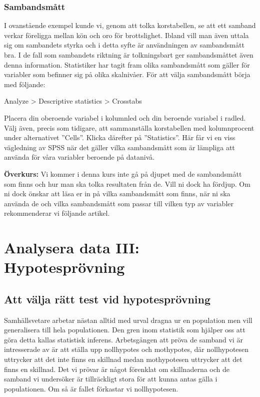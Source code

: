 \documentclass[
]{book}
\begin{document}
\hypertarget{sambandsmuxe5tt}{%
\section{Sambandsmått}\label{sambandsmuxe5tt}}

I ovanstående exempel kunde vi, genom att tolka korstabellen, se att ett samband verkar föreligga
mellan kön och oro för brottslighet. Ibland vill man även uttala sig om sambandets styrka och i detta
syfte är användningen av sambandsmått bra. I de fall som sambandets riktning är tolkningsbart ger
sambandsmåttet även denna information. Statistiker har tagit fram olika sambandsmått som gäller för
variabler som befinner sig på olika skalnivåer. För att välja sambandsmått börja med följande:

Analyze \textgreater{} Descriptive statistics \textgreater{} Crosstabs

Placera din oberoende variabel i kolumnled och din beroende variabel i radled. Välj även, precis som
tidigare, att sammanställa korstabellen med kolumnprocent under alternativet ''Cells''. Klicka därefter
på ''Statistics''. Här får vi en viss vägledning av SPSS när det gäller vilka sambandsmått som är lämpliga att använda för våra variabler beroende på datanivå.

\textbf{Överkurs:}
Vi kommer i denna kurs inte gå på djupet med de sambandsmått som finns och hur man ska tolka resultaten från de. Vill ni dock ha fördjup. Om ni dock önskar att läsa er in på vilka sambandsmått som finns, när ni ska använda de och vilka sambandsmått som passar till vilken typ av variabler rekommenderar vi följande artikel.

\hypertarget{part-analysera-data-iii-hypotespruxf6vning}{%
\part*{Analysera data III: Hypotesprövning}\label{part-analysera-data-iii-hypotespruxf6vning}}

\hypertarget{att-vuxe4lja-ruxe4tt-test-vid-hypotespruxf6vning}{%
\chapter{Att välja rätt test vid hypotesprövning}\label{att-vuxe4lja-ruxe4tt-test-vid-hypotespruxf6vning}}

Samhällsvetare arbetar nästan alltid med urval dragna ur en population men vill generalisera till hela
populationen. Den gren inom statistik som hjälper oss att göra detta kallas statistisk inferens.
Arbetsgången att pröva de samband vi är intresserade av är att ställa upp nollhypotes och mothypotes,
där nollhypotesen uttrycker att det inte finns en skillnad medan mothypotesen uttrycker att det finns
en skillnad. Det vi prövar är något förenklat om skillnaderna och de samband vi undersöker är tillräckligt
stora för att kunna antas gälla i populationen. Om så är fallet förkastar vi nollhypotesen.
\end{document}

